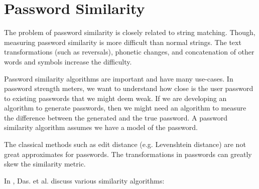 \section{Password Similarity}
\begin{center}
\end{center}

The problem of password similarity is closely related to string matching. Though, measuring password similarity is more difficult than normal strings. The text transformations (such as reversals), phonetic changes, and concatenation of other words and symbols increase the difficulty.

Password similarity algorithms are important and have many use-cases. In password strength meters, we want to understand how close is the user password to existing passwords that we might deem weak. If we are developing an algorithm to generate passwords, then we might need an algorithm to measure the difference between the generated and the true password. A password similarity algorithm assumes we have a model of the password.

The classical methods such as edit distance (e.g. Levenshtein distance) are not great approximates for passwords. The transformations in passwords can greatly skew the similarity metric.

In \cite{das_tangled_2014}, Das. et al. discuss various similarity algorithms:

